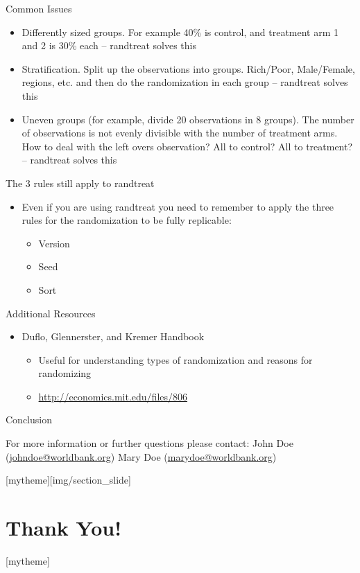 \documentclass[aspectratio=169]{beamer}
\newcommand{\sectionpic}[2]{
	\setbeamertemplate{section page}[mytheme][#2]
	\section{#1}
	\setbeamertemplate{section page}[mytheme]
}
\begin{document}
\begin{frame}{Common Issues}
\begin{itemize}
	\item Differently sized groups. For example 40\% is control, and treatment arm 1 and 2 is 30\% each – randtreat solves this
	\item Stratification. Split up the observations into groups. Rich/Poor, Male/Female, regions, etc. and then do the randomization in each group – randtreat solves this
	\item Uneven groups (for example, divide 20 observations in 8 groups). The number of observations is not evenly divisible with the number of treatment arms. How to deal with the left overs observation? All to control? All to treatment? – randtreat solves this
\end{itemize}
\end{frame}



\begin{frame}{The 3 rules still apply to randtreat}
\begin{itemize}
	\item Even if you are using randtreat you need to remember to apply the three rules for the randomization to be fully replicable:
		\begin{itemize}
			\item Version
			\item Seed
			\item Sort
		\end{itemize}
\end{itemize}
\end{frame}


\begin{frame}{Additional Resources}
\begin{itemize}
	\item Duflo, Glennerster, and Kremer Handbook
		\begin{itemize}
			\item Useful for understanding types of randomization and reasons for randomizing
			\item \url{http://economics.mit.edu/files/806}
		\end{itemize}
\end{itemize}
\end{frame}


\begin{frame}{Conclusion}


\vspace{20mm}
For more information or further questions please contact:
\newline John Doe (\url{johndoe@worldbank.org}) \newline Mary Doe (\url{marydoe@worldbank.org})

\end{frame}

\sectionpic{Thank You!}{img/section_slide}
\end{document}
